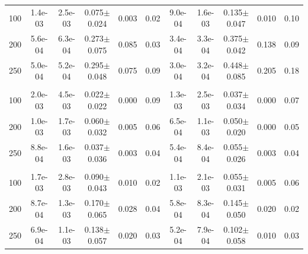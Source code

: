 \begin{tabular}{ccccccccccc}
100 & 1.4e-03 & 2.5e-03 & 0.075$\pm$0.024 & 0.003 & 0.02 & 9.0e-04 & 1.6e-03 & 0.135$\pm$0.047 & 0.010 & 0.10 \\
200 & 5.6e-04 & 6.3e-04 & 0.273$\pm$0.075 & 0.085 & 0.03 & 3.4e-04 & 3.3e-04 & 0.375$\pm$0.042 & 0.138 & 0.09 \\
250 & 5.0e-04 & 5.2e-04 & 0.295$\pm$0.048 & 0.075 & 0.09 & 3.0e-04 & 3.2e-04 & 0.448$\pm$0.085 & 0.205 & 0.18 \\
\addlinespace[3pt]
\multicolumn{11}{l}{\textit{Amazon / RoBERTa, shared pool (1,500)}} \\
100 & 2.0e-03 & 4.5e-03 & 0.022$\pm$0.022 & 0.000 & 0.09 & 1.3e-03 & 2.5e-03 & 0.037$\pm$0.034 & 0.000 & 0.07 \\
200 & 1.0e-03 & 1.7e-03 & 0.060$\pm$0.032 & 0.005 & 0.06 & 6.5e-04 & 1.1e-03 & 0.050$\pm$0.020 & 0.000 & 0.05 \\
250 & 8.8e-04 & 1.6e-03 & 0.037$\pm$0.036 & 0.003 & 0.04 & 5.4e-04 & 8.4e-04 & 0.055$\pm$0.026 & 0.003 & 0.04 \\
\addlinespace[3pt]
\multicolumn{11}{l}{\textit{Amazon / RoBERTa, disjoint pools (750 + 750)}} \\
100 & 1.7e-03 & 2.8e-03 & 0.090$\pm$0.043 & 0.010 & 0.02 & 1.1e-03 & 2.1e-03 & 0.055$\pm$0.031 & 0.005 & 0.06 \\
200 & 8.7e-04 & 1.3e-03 & 0.170$\pm$0.065 & 0.028 & 0.04 & 5.8e-04 & 8.3e-04 & 0.145$\pm$0.050 & 0.020 & 0.02 \\
250 & 6.9e-04 & 1.1e-03 & 0.138$\pm$0.057 & 0.020 & 0.03 & 5.2e-04 & 7.9e-04 & 0.102$\pm$0.058 & 0.010 & 0.03 \\
\bottomrule
\end{tabular}